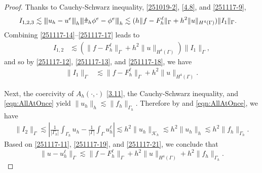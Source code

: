 \documentclass[10pt, a4paper]{amsart}
\newcommand{\calK}{\mathcal{K}}
\theoremstyle{definition}
\theoremstyle{remark}
\theoremstyle{example}
\numberwithin{equation}{section}
\newcommand{\tbar}[1]{{\left\vert\kern-0.25ex\left\vert\kern-0.25ex\left\vert #1 
    \right\vert\kern-0.25ex\right\vert\kern-0.25ex\right\vert}}
\begin{document}
\begin{proof}
Thanks to Cauchy-Schwarz inequality, \eqref{251019-2}, \eqref{4.8}, and \eqref{251117-9},
\begin{align*}
I_{1,2,3}
& \lesssim \tbar{u_h - u^e}_h\tbar{\mathring{\pi}_h\phi^e - \phi^e}_h 
 \lesssim (h\|f-F_h^\ell\|_{\Gamma} + h^2\|u\|_{H^4(\Gamma)})\|I_1\|_\Gamma.
\end{align*}
Combining \eqref{251117-14}--\eqref{251117-17} leads to
\begin{align}
I_{1,2}
& \lesssim (\|f-F_h^\ell\|_{\Gamma} + h^2\|u\|_{H^4(\Gamma)})\|I_1\|_\Gamma, \label{251117-18}
\end{align}
and so by  \eqref{251117-12}, \eqref{251117-13}, and \eqref{251117-18},
we have
%
\begin{align}
\|I_1\|_\Gamma
& \lesssim  \|f-F^\ell_h\|_{\Gamma} + h^2\|u\|_{H^4(\Gamma)}. \label{251117-19}
\end{align}

Next, the coercivity of $A_h(\cdot,\cdot)$ \eqref{3.11},
the Cauchy-Schwarz inequality, and \eqref{eqn:AllAtOnce} 
yield $\|u_h\|_h\lesssim \|f_h\|_{\Gamma_h}$.
Therefore by \cite[(6.39)]{burman2017cut} and \eqref{eqn:AllAtOnce}, we have
\begin{align}
\|I_2\|_\Gamma
\lesssim \left|\frac{1}{|\Gamma_h|}\int_{\Gamma_h}u_h - \frac{1}{|\Gamma|}\int_\Gamma u_h^\ell\right|
\lesssim h^2\|u_h\|_{\calK_h}
\lesssim h^2\|u_h\|_h
\lesssim h^2\|f_h\|_{\Gamma_h}. \label{251117-21}
\end{align}
Based on \eqref{251117-11}, \eqref{251117-19}, and \eqref{251117-21}, we conclude that
\[
\|u - u_h^\ell\|_\Gamma
\lesssim \|f-F^\ell_h\|_{\Gamma} + h^2\|u\|_{H^4(\Gamma)} + h^2\|f_h\|_{\Gamma_h}.
\]
\end{proof}
\end{document}
